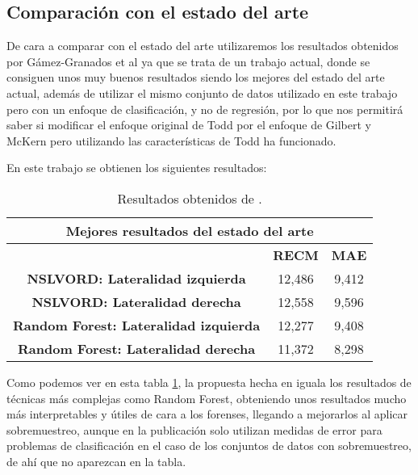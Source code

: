 \subsection{Comparación con el estado del arte}

De cara a comparar con el estado del arte utilizaremos los resultados obtenidos por Gámez-Granados et al \cite{NSLVOrdAge} ya que se trata de un trabajo actual, donde se consiguen unos muy buenos resultados siendo los mejores del estado del arte actual, además de utilizar el mismo conjunto de datos utilizado en este trabajo pero con un enfoque de clasificación, y no de regresión, por lo que nos permitirá saber si modificar el enfoque original de Todd por el enfoque de Gilbert y McKern pero utilizando las características de Todd ha funcionado.

En este trabajo se obtienen los siguientes resultados:


\begin{table}[H]
\centering
\begin{tabular}{|c|c|c|}
\hline
\multicolumn{3}{|c|}{\textbf{Mejores resultados del estado del arte}}        \\ \hline
\textbf{}                                     & \textbf{RECM} & \textbf{MAE} \\ \hline
\textbf{NSLVORD: Lateralidad izquierda}       & 12,486        & 9,412        \\ \hline
\textbf{NSLVORD: Lateralidad derecha}         & 12,558        & 9,596        \\ \hline
\textbf{Random Forest: Lateralidad izquierda} & 12,277        & 9,408        \\ \hline
\textbf{Random Forest: Lateralidad derecha}   & 11,372        & 8,298        \\ \hline
\end{tabular}%
\caption{Resultados obtenidos de \cite{NSLVOrdAge}.}\label{table:resultados_estado_arte}
\end{table}

Como podemos ver en esta tabla \ref{table:resultados_estado_arte}, la propuesta hecha en \cite{NSLVOrdAge} iguala los resultados de técnicas más complejas como Random Forest, obteniendo unos resultados mucho más interpretables y útiles de cara a los forenses, llegando a mejorarlos al aplicar sobremuestreo, aunque en la publicación solo utilizan medidas de error para problemas de clasificación en el caso de los conjuntos de datos con sobremuestreo, de ahí que no aparezcan en la tabla.

